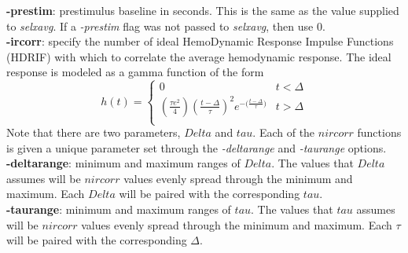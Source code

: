 \documentclass[10pt]{article}
\begin{document}
\noindent
{\bf -prestim}: prestimulus baseline in seconds.  This is the
same as the value supplied to {\em selxavg}.  If a {\em -prestim} flag was
not passed to {\em selxavg}, then use 0.\\

\noindent
{\bf -ircorr}: specify the number of ideal HemoDynamic Response
Impulse Functions (HDRIF) with which to correlate the average
hemodynamic response.  The ideal response is modeled as a gamma
function of the form
\begin{equation}
h(t) = 
\begin{cases}
0 & t < \Delta \\
(\frac{\tau e^2}{4})
( \frac{t-\Delta}{\tau} )^2 e^{{-(\frac{t-\Delta}{\tau}})} & t > \Delta \\
\end{cases}
\label{hideal.eqn}
\end{equation}
Note that there are two parameters, $Delta$ and $tau$.  Each of the
$nircorr$ functions is given a unique parameter set through the {\em
-deltarange} and {\em -taurange} options.\\

\noindent
{\bf -deltarange}: minimum and maximum ranges of $Delta$.  The values
that $Delta$ assumes will be $nircorr$ values evenly spread through
the minimum and maximum.  Each $Delta$ will be paired with the
corresponding $tau$.\\

\noindent
{\bf -taurange}: minimum and maximum ranges of $tau$.  The values
that $tau$ assumes will be $nircorr$ values evenly spread through
the minimum and maximum. Each $\tau$ will be paired with the
corresponding $\Delta$.\\
\end{document}
